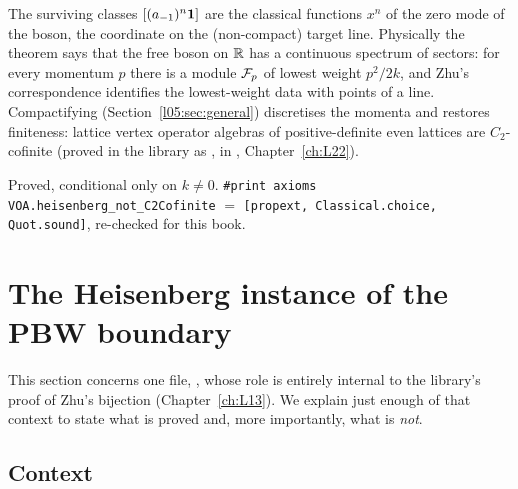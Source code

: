 \begin{physics}
The surviving classes $[(a_{-1})^n\mathbf{1}]$ are the classical functions $x^n$ of the zero mode of the
boson, the coordinate on the (non-compact) target line. Physically the theorem says that the free boson
on $\mathbb{R}$ has a continuous spectrum of sectors: for every momentum $p$ there is a module $\mathcal{F}_p$
of lowest weight $p^2/2k$, and Zhu's correspondence identifies the lowest-weight data with points of a
line. Compactifying (Section~\ref{l05:sec:general}) discretises the momenta and restores finiteness:
lattice vertex operator algebras of positive-definite even lattices are $C_2$-cofinite (proved in the
library as , in ,
Chapter~\ref{ch:L22}).
\end{physics}

\begin{status}
Proved, conditional only on $k\ne0$. \texttt{\#print axioms VOA.heisenberg\_not\_C2Cofinite} $=$
\texttt{[propext, Classical.choice, Quot.sound]}, re-checked for this book.
\end{status}

\section{The Heisenberg instance of the PBW boundary}\label{l05:sec:pbw}

This section concerns one file, ,
whose role is entirely internal to the library's proof of Zhu's bijection (Chapter~\ref{ch:L13}). We explain
just enough of that context to state what is proved and, more importantly, what is \emph{not}.

\subsection{Context}

